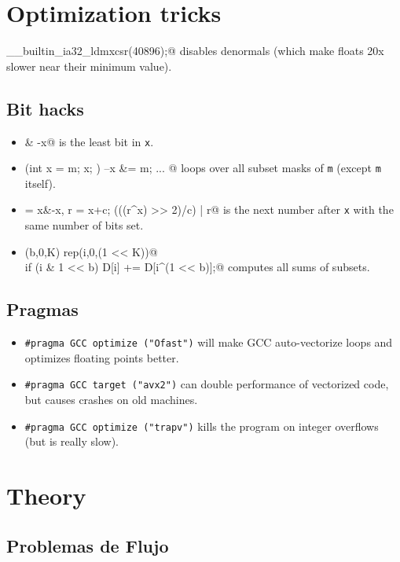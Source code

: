 \section{Optimization tricks}
	\verb@__builtin_ia32_ldmxcsr(40896);@ disables denormals (which make floats 20x slower near their minimum value).
	\subsection{Bit hacks}
		\begin{itemize}
			\item \verb@x & -x@ is the least bit in \texttt{x}.
			\item \verb@for (int x = m; x; ) { --x &= m; ... }@ loops over all subset masks of \texttt{m} (except \texttt{m} itself).
			\item \verb@c = x&-x, r = x+c; (((r^x) >> 2)/c) | r@ is the next number after \texttt{x} with the same number of bits set.
			\item \verb@rep(b,0,K) rep(i,0,(1 << K))@ \\ \verb@  if (i & 1 << b) D[i] += D[i^(1 << b)];@ computes all sums of subsets.
		\end{itemize}
	\subsection{Pragmas}
		\begin{itemize}
			\item \lstinline{#pragma GCC optimize ("Ofast")} will make GCC auto-vectorize loops and optimizes floating points better.
			\item \lstinline{#pragma GCC target ("avx2")} can double performance of vectorized code, but causes crashes on old machines.
			\item \lstinline{#pragma GCC optimize ("trapv")} kills the program on integer overflows (but is really slow).
		\end{itemize}
	
\section{Theory}
\subsection{Problemas de Flujo}

